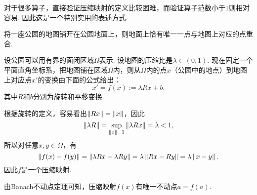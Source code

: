 对于很多算子，直接验证压缩映射的定义比较困难，而验证算子范数小于$1$则相对容易. 因此这是一个特别实用的表述方式. 

\begin{example}[落在地面上的地图]
将一座公园的地图铺开在公园地面上，则地面上恰有唯一一点与地图上对应的点重合. 

设公园可以用有界的面闭区域$\Omega$表示. 设地图的压缩比是$\lambda\in(0,1)$. 现在固定一个平面直角坐标系，把地图铺在区域$\Omega$内，则从$\Omega$内的点$x$（公园中的地点）到地图上对应点$x'$的变换由下面的公式给出：
\[x' = f(x) := \lambda Rx + b.\]
其中$R$和$b$分别为旋转和平移变换. 

根据旋转的定义，容易看出$\left\|Rx\right\|=\left\|x\right\|$，因此
\[\left\|\lambda R\right\|=\sup_{\left\|x\right\|=1}\left\|\lambda Rx\right\|=\lambda<1,\]
所以对任意$x,y\in\Omega$，有
\[\left\|f(x)-f(y)\right\|=\left\|\lambda Rx-\lambda Ry\right\|=\lambda\left\|Rx-Ry\right\|= \lambda\left\|x-y\right\|.\]
因此$f$是一个压缩映射.

由Banach不动点定理可知，压缩映射$f(x)$有唯一不动点$a=f(a)$.
\end{example}

